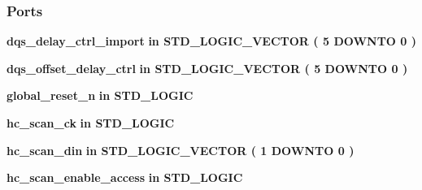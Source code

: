 \subsubsection*{Ports}
 \begin{DoxyCompactItemize}
\item 
{\bf dqs\+\_\+delay\+\_\+ctrl\+\_\+import}  {\bfseries {\bfseries \textcolor{keywordflow}{in}\textcolor{vhdlchar}{ }}} {\bfseries \textcolor{comment}{S\+T\+D\+\_\+\+L\+O\+G\+I\+C\+\_\+\+V\+E\+C\+T\+OR}\textcolor{vhdlchar}{ }\textcolor{vhdlchar}{(}\textcolor{vhdlchar}{ }\textcolor{vhdlchar}{ } \textcolor{vhdldigit}{5} \textcolor{vhdlchar}{ }\textcolor{keywordflow}{D\+O\+W\+N\+TO}\textcolor{vhdlchar}{ }\textcolor{vhdlchar}{ } \textcolor{vhdldigit}{0} \textcolor{vhdlchar}{ }\textcolor{vhdlchar}{)}\textcolor{vhdlchar}{ }} 
\item 
{\bf dqs\+\_\+offset\+\_\+delay\+\_\+ctrl}  {\bfseries {\bfseries \textcolor{keywordflow}{in}\textcolor{vhdlchar}{ }}} {\bfseries \textcolor{comment}{S\+T\+D\+\_\+\+L\+O\+G\+I\+C\+\_\+\+V\+E\+C\+T\+OR}\textcolor{vhdlchar}{ }\textcolor{vhdlchar}{(}\textcolor{vhdlchar}{ }\textcolor{vhdlchar}{ } \textcolor{vhdldigit}{5} \textcolor{vhdlchar}{ }\textcolor{keywordflow}{D\+O\+W\+N\+TO}\textcolor{vhdlchar}{ }\textcolor{vhdlchar}{ } \textcolor{vhdldigit}{0} \textcolor{vhdlchar}{ }\textcolor{vhdlchar}{)}\textcolor{vhdlchar}{ }} 
\item 
{\bf global\+\_\+reset\+\_\+n}  {\bfseries {\bfseries \textcolor{keywordflow}{in}\textcolor{vhdlchar}{ }}} {\bfseries \textcolor{comment}{S\+T\+D\+\_\+\+L\+O\+G\+IC}\textcolor{vhdlchar}{ }} 
\item 
{\bf hc\+\_\+scan\+\_\+ck}  {\bfseries {\bfseries \textcolor{keywordflow}{in}\textcolor{vhdlchar}{ }}} {\bfseries \textcolor{comment}{S\+T\+D\+\_\+\+L\+O\+G\+IC}\textcolor{vhdlchar}{ }} 
\item 
{\bf hc\+\_\+scan\+\_\+din}  {\bfseries {\bfseries \textcolor{keywordflow}{in}\textcolor{vhdlchar}{ }}} {\bfseries \textcolor{comment}{S\+T\+D\+\_\+\+L\+O\+G\+I\+C\+\_\+\+V\+E\+C\+T\+OR}\textcolor{vhdlchar}{ }\textcolor{vhdlchar}{(}\textcolor{vhdlchar}{ }\textcolor{vhdlchar}{ } \textcolor{vhdldigit}{1} \textcolor{vhdlchar}{ }\textcolor{keywordflow}{D\+O\+W\+N\+TO}\textcolor{vhdlchar}{ }\textcolor{vhdlchar}{ } \textcolor{vhdldigit}{0} \textcolor{vhdlchar}{ }\textcolor{vhdlchar}{)}\textcolor{vhdlchar}{ }} 
\item 
{\bf hc\+\_\+scan\+\_\+enable\+\_\+access}  {\bfseries {\bfseries \textcolor{keywordflow}{in}\textcolor{vhdlchar}{ }}} {\bfseries \textcolor{comment}{S\+T\+D\+\_\+\+L\+O\+G\+IC}\textcolor{vhdlchar}{ }} 

\end{DoxyCompactItemize}
